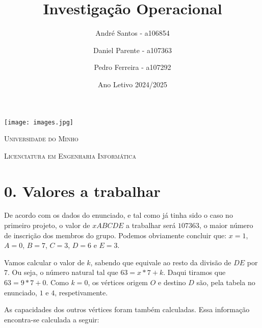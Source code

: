 \documentclass[a4paper,12pt]{article}
\title{
    Investigação Operacional\protect\\
}
\author{André Santos - a106854
    \and Daniel Parente - a107363
    \and Pedro Ferreira - a107292
}
\date{Ano Letivo 2024/2025}
\begin{document}
\vspace*{\fill} %

\begin{minipage}{0.9\linewidth}
    \centering
    \texttt{[image: images.jpg]}\par
    \vspace{1cm}

    {\scshape\LARGE Universidade do Minho} \par
    \vspace{0.6cm}

    {\scshape\Large Licenciatura em Engenharia Informática} \par
    \maketitle
    \vspace{1cm}
\end{minipage}

\vspace*{\fill}
\pagebreak

\section*{0. Valores a trabalhar}
De acordo com os dados do enunciado, e tal como já tinha sido o caso no primeiro projeto, o valor de $xABCDE$ a trabalhar será $107363$, o maior número de inscrição dos membros do grupo. Podemos obviamente concluir que: $x = 1$, $A = 0$, $B = 7$, $C = 3$, $D = 6$ e $E = 3$.

\vspace{0.5em}

Vamos calcular o valor de $k$, sabendo que equivale ao resto da divisão de $DE$ por $7$. Ou seja, o número natural tal que $63 = x * 7 + k$. Daqui tiramos que $63 = 9 * 7 + 0$. Como $k = 0$, os vértices origem $O$ e destino $D$ são, pela tabela no enunciado, $1$ e $4$, respetivamente.

\vspace{0.5em}

As capacidades dos outros vértices foram também calculadas. Essa informação encontra-se calculada a seguir:
\end{document}
